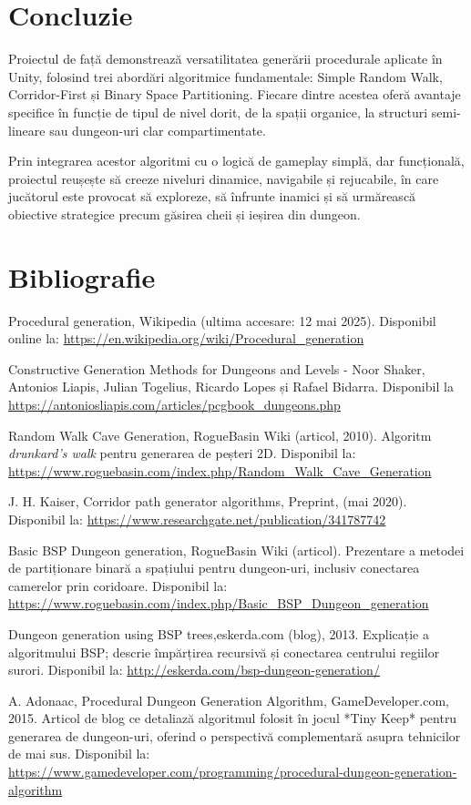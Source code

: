 \documentclass{article}
\begin{document}
	\section{Concluzie}
\tab Proiectul de față demonstrează versatilitatea generării procedurale aplicate în Unity, folosind trei abordări algoritmice fundamentale: Simple Random Walk, Corridor-First și Binary Space Partitioning. Fiecare dintre acestea oferă avantaje specifice în funcție de tipul de nivel dorit, de la spații organice, la structuri semi-lineare sau dungeon-uri clar compartimentate.

Prin integrarea acestor algoritmi cu o logică de gameplay simplă, dar funcțională, proiectul reușește să creeze niveluri dinamice, navigabile și rejucabile, în care jucătorul este provocat să exploreze, să înfrunte inamici și să urmărească obiective strategice precum găsirea cheii și ieșirea din dungeon.
	\newpage
	\section{Bibliografie}
\begin{thebibliography}{6}
Procedural generation, Wikipedia (ultima accesare: 12 mai 2025). Disponibil online la: \url{https://en.wikipedia.org/wiki/Procedural_generation}

Constructive Generation Methods for Dungeons and Levels
- Noor Shaker, Antonios Liapis, Julian Togelius, Ricardo Lopes și Rafael Bidarra. Disponibil la \url{https://antoniosliapis.com/articles/pcgbook_dungeons.php}


Random Walk Cave Generation, RogueBasin Wiki (articol, 2010). Algoritm \textit{drunkard's walk} pentru generarea de peșteri 2D. Disponibil la: \url{https://www.roguebasin.com/index.php/Random_Walk_Cave_Generation}

J. H. Kaiser, Corridor path generator algorithms, Preprint, (mai 2020). Disponibil la:  \url{https://www.researchgate.net/publication/341787742}

Basic BSP Dungeon generation, RogueBasin Wiki (articol). Prezentare a metodei de partiționare binară a spațiului pentru dungeon-uri, inclusiv conectarea camerelor prin coridoare. Disponibil la: \url{https://www.roguebasin.com/index.php/Basic_BSP_Dungeon_generation}

Dungeon generation using BSP trees,eskerda.com (blog), 2013. Explicație a algoritmului BSP; descrie împărțirea recursivă și conectarea centrului regiilor surori. Disponibil la: \url{http://eskerda.com/bsp-dungeon-generation/}

A. Adonaac, Procedural Dungeon Generation Algorithm, GameDeveloper.com, 2015. Articol de blog ce detaliază algoritmul folosit în jocul *Tiny Keep* pentru generarea de dungeon-uri, oferind o perspectivă complementară asupra tehnicilor de mai sus. Disponibil la: \url{https://www.gamedeveloper.com/programming/procedural-dungeon-generation-algorithm}

\end{thebibliography}
\end{document}
